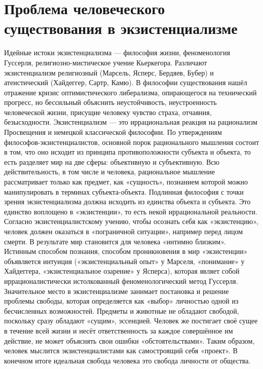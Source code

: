 \documentclass[12pt]{article}
\begin{document}
\newpage
\section{Проблема человеческого существования в экзистенциализме}
Идейные истоки экзистенциализма — философия жизни, феноменология Гуссерля, религиозно-мистическое
учение  Кьеркегора.  Различают  экзистенциализм  религиозный  (Марсель,  Ясперс,  Бердяев,  Бубер)  и
атеистический  (Хайдеггер,  Сартр,  Камю).  В  философии  существования  нашёл  отражение  кризис
оптимистического  либерализма,  опирающегося  на  технический  прогресс,  но  бессильный  объяснить
неустойчивость,  неустроенность  человеческой  жизни,  присущие  человеку  чувство  страха,  отчаяния,
безысходности.
Экзистенциализм  —  это  иррациональная  реакция  на  рационализм  Просвещения  и  немецкой  классической
философии.  По  утверждениям  философов-экзистенциалистов,  основной  порок  рационального  мышления
состоит в том, что оно исходит из принципа противоположности субъекта и объекта, то есть разделяет мир на
две  сферы:  объективную  и  субъективную.  Всю  действительность,  в  том  числе  и  человека,  рациональное
мышление рассматривает только как предмет, как «сущность», познанием которой можно манипулировать в
терминах  субъекта-объекта.  Подлинная  философия  с  точки  зрения  экзистенциализма  должна  исходить  из
единства  объекта  и  субъекта.  Это  единство  воплощено  в  «экзистенции»,  то  есть  некой  иррациональной
реальности.
Согласно экзистенциалистскому учению, чтобы осознать себя как «экзистенцию», человек должен оказаться в
«пограничной ситуации», например перед лицом смерти. В результате мир становится для человека «интимно
близким». Истинным способом познания, способом проникновения в мир «экзистенции» объявляется интуиция
(«экзистенциальный опыт» у Марселя, «понимание» у Хайдеггера, «экзистенциальное озарение» у Ясперса),
которая являет собой иррационалистически истолкованный феноменологический метод Гуссерля.
Значительное  место  в  экзистенциализме  занимает  постановка  и  решение  проблемы  свободы,  которая
определяется  как  «выбор»  личностью  одной  из  бесчисленных  возможностей.  Предметы  и  животные  не
обладают свободой, поскольку сразу обладают «сущим», эссенцией. Человек же постигает своё сущее в течение
всей жизни и несёт ответственность за каждое совершённое им действие, не может объяснять свои ошибки
«обстоятельствами». Таким образом, человек мыслится экзистенциалистами как самостроящий себя «проект».
В конечном итоге идеальная свобода человека это свобода личности от общества.
\end{document}
